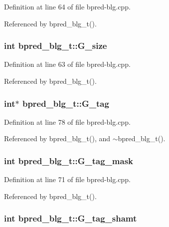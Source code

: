 Definition at line 64 of file bpred-blg.cpp.

Referenced by bpred\_\-blg\_\-t().
\subsubsection[{G\_\-size}]{\setlength{\rightskip}{0pt plus 5cm}int {\bf bpred\_\-blg\_\-t::G\_\-size}\hspace{0.3cm}{\tt  [protected]}}\label{classbpred__blg__t_dcd3a9d6331ff72a2765c3701495231d}




Definition at line 63 of file bpred-blg.cpp.

Referenced by bpred\_\-blg\_\-t().
\subsubsection[{G\_\-tag}]{\setlength{\rightskip}{0pt plus 5cm}int$\ast$ {\bf bpred\_\-blg\_\-t::G\_\-tag}\hspace{0.3cm}{\tt  [protected]}}\label{classbpred__blg__t_6e0d7361c6890613f5013568a40107e1}




Definition at line 78 of file bpred-blg.cpp.

Referenced by bpred\_\-blg\_\-t(), and $\sim$bpred\_\-blg\_\-t().
\subsubsection[{G\_\-tag\_\-mask}]{\setlength{\rightskip}{0pt plus 5cm}int {\bf bpred\_\-blg\_\-t::G\_\-tag\_\-mask}\hspace{0.3cm}{\tt  [protected]}}\label{classbpred__blg__t_aabef861cf84e87c00573303e86cf03c}




Definition at line 71 of file bpred-blg.cpp.

Referenced by bpred\_\-blg\_\-t().
\subsubsection[{G\_\-tag\_\-shamt}]{\setlength{\rightskip}{0pt plus 5cm}int {\bf bpred\_\-blg\_\-t::G\_\-tag\_\-shamt}\hspace{0.3cm}{\tt  [protected]}}\label{classbpred__blg__t_32ae3a3162d8a4a5e5273c3562197ae1}




